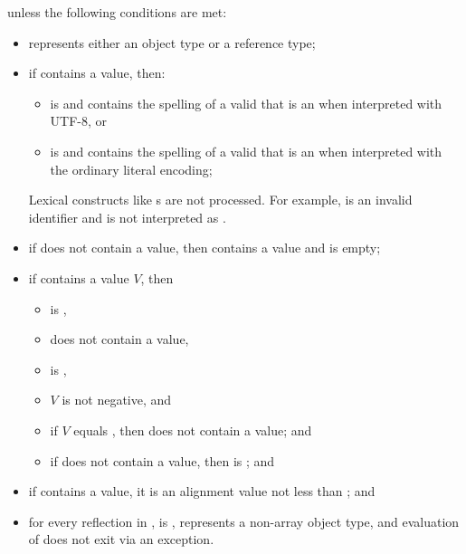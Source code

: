 \begin{itemdescr}
\pnum
\throws
{} unless the following conditions are met:
\begin{itemize}
\item
   represents either an object type or a reference type;
\item
  if  contains a value, then:
  \begin{itemize}
  \item
     is 
    and 
    contains the spelling of a valid 
    that is an 
    when interpreted with UTF-8, or
  \item
     is 
    and 
    contains the spelling of a valid 
    that is an 
    when interpreted with the ordinary literal encoding;
  \end{itemize}
  \begin{note}
  Lexical constructs like
  s are not processed.
  For example,  is an invalid identifier
  and is not interpreted as .
  \end{note}
\item
  if  does not contain a value,
  then  contains a value and
   is empty;
\item
  if  contains a value $V$, then
  \begin{itemize}
  \item
     is ,
  \item
     does not contain a value,
  \item
     is ,
  \item
    $V$ is not negative, and
  \item
    if $V$ equals ,
    then  does not contain a value; and
  \item
    if  does not contain a value, then
     is ; and
  \end{itemize}
  \item
    if  contains a value,
    it is an alignment value
    not less than ; and
  \item
    for every reflection  in ,
     is ,
     represents a non-array object type, and
    evaluation of  does not exit via an exception.
\end{itemize}
\end{itemdescr}

